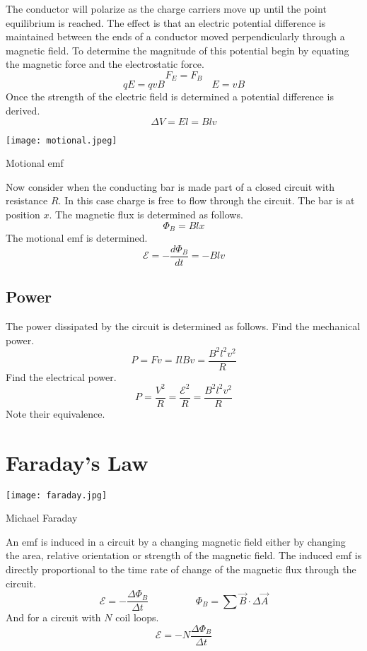 The conductor will polarize as the charge carriers move up until the point equilibrium is reached.  The effect is that an electric potential difference is maintained between the ends of a conductor moved perpendicularly through a magnetic field.  To determine the magnitude of this potential begin by equating the magnetic force and the electrostatic force.
$$F_E=F_B$$
$$qE=qvB \hspace{2cm} E=vB$$
Once the strength of the electric field is determined a potential difference is derived.
$$\Delta V=El=Blv$$

\newpage
\begin{marginfigure}[10pt]%
  \texttt{[image: motional.jpeg]}
  \caption{Motional emf}
  \label{fig:marginfig}
\end{marginfigure}
\noindent Now consider when the conducting bar is made part of a closed circuit with resistance $R$. In this case charge is free to flow through the circuit.  The bar is at position $x$.  The magnetic flux is determined as follows.
$$\Phi_B=Blx$$
The motional emf is determined.  
$$ \mathcal{E}=-\frac{d\Phi_B}{dt}=-Blv$$



\subsection{Power}
The power dissipated by the circuit is determined as follows.  Find the mechanical power.
$$P=Fv=IlBv=\frac{B^2l^2v^2}{R}$$
Find the electrical power. 
$$P=\frac{V^2}{R}=\frac{\mathcal{E}^2}{R}=\frac{B^2l^2v^2}{R}$$
Note their equivalence.


\section{Faraday's Law}
\begin{marginfigure}[150pt]%
  \texttt{[image: faraday.jpg]}
  \caption{Michael Faraday}
  \label{fig:marginfig}
\end{marginfigure}

An emf is induced in a circuit by a changing magnetic field either by changing the area, relative orientation or strength of the magnetic field.  The induced emf is directly proportional to the time rate of change of the magnetic flux through the circuit.
$$ \mathcal{E}=-\frac{\Delta\Phi_B}{\Delta t} \hspace{2cm} \Phi_B=\sum\overrightarrow{B}\cdot \Delta\overrightarrow{A}$$
And for a circuit with $N$ coil loops.
$$ \mathcal{E}=-N\frac{\Delta\Phi_B}{\Delta t}$$



